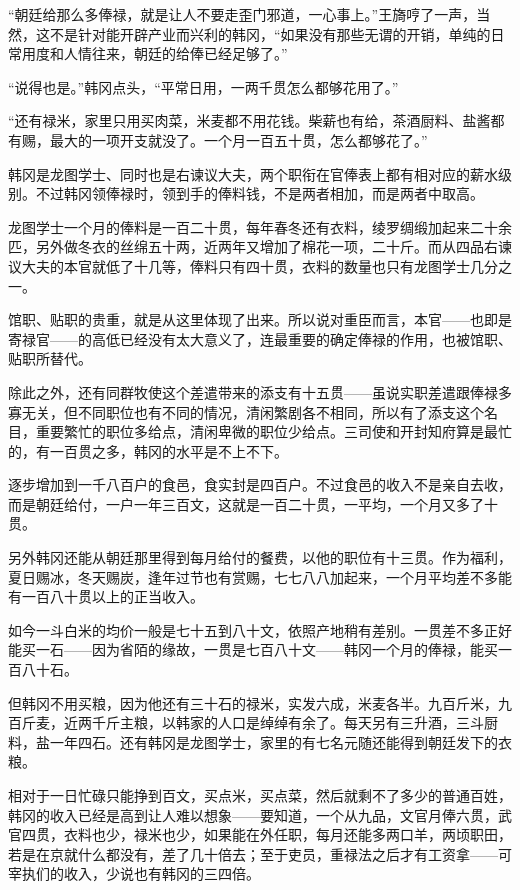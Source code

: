 “朝廷给那么多俸禄，就是让人不要走歪门邪道，一心事上。”王旖哼了一声，当然，这不是针对能开辟产业而兴利的韩冈，“如果没有那些无谓的开销，单纯的日常用度和人情往来，朝廷的给俸已经足够了。”

“说得也是。”韩冈点头，“平常日用，一两千贯怎么都够花用了。”

“还有禄米，家里只用买肉菜，米麦都不用花钱。柴薪也有给，茶酒厨料、盐酱都有赐，最大的一项开支就没了。一个月一百五十贯，怎么都够花了。”

韩冈是龙图学士、同时也是右谏议大夫，两个职衔在官俸表上都有相对应的薪水级别。不过韩冈领俸禄时，领到手的俸料钱，不是两者相加，而是两者中取高。

龙图学士一个月的俸料是一百二十贯，每年春冬还有衣料，绫罗绸缎加起来二十余匹，另外做冬衣的丝绵五十两，近两年又增加了棉花一项，二十斤。而从四品右谏议大夫的本官就低了十几等，俸料只有四十贯，衣料的数量也只有龙图学士几分之一。

馆职、贴职的贵重，就是从这里体现了出来。所以说对重臣而言，本官——也即是寄禄官——的高低已经没有太大意义了，连最重要的确定俸禄的作用，也被馆职、贴职所替代。

除此之外，还有同群牧使这个差遣带来的添支有十五贯——虽说实职差遣跟俸禄多寡无关，但不同职位也有不同的情况，清闲繁剧各不相同，所以有了添支这个名目，重要繁忙的职位多给点，清闲卑微的职位少给点。三司使和开封知府算是最忙的，有一百贯之多，韩冈的水平是不上不下。

逐步增加到一千八百户的食邑，食实封是四百户。不过食邑的收入不是亲自去收，而是朝廷给付，一户一年三百文，这就是一百二十贯，一平均，一个月又多了十贯。

另外韩冈还能从朝廷那里得到每月给付的餐费，以他的职位有十三贯。作为福利，夏日赐冰，冬天赐炭，逢年过节也有赏赐，七七八八加起来，一个月平均差不多能有一百八十贯以上的正当收入。

如今一斗白米的均价一般是七十五到八十文，依照产地稍有差别。一贯差不多正好能买一石——因为省陌的缘故，一贯是七百八十文——韩冈一个月的俸禄，能买一百八十石。

但韩冈不用买粮，因为他还有三十石的禄米，实发六成，米麦各半。九百斤米，九百斤麦，近两千斤主粮，以韩家的人口是绰绰有余了。每天另有三升酒，三斗厨料，盐一年四石。还有韩冈是龙图学士，家里的有七名元随还能得到朝廷发下的衣粮。

相对于一日忙碌只能挣到百文，买点米，买点菜，然后就剩不了多少的普通百姓，韩冈的收入已经是高到让人难以想象——要知道，一个从九品，文官月俸六贯，武官四贯，衣料也少，禄米也少，如果能在外任职，每月还能多两口羊，两顷职田，若是在京就什么都没有，差了几十倍去；至于吏员，重禄法之后才有工资拿——可宰执们的收入，少说也有韩冈的三四倍。

